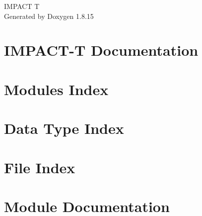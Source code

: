 \let\mypdfximage\pdfximage\def\pdfximage{\immediate\mypdfximage}\documentclass[twoside]{book}
\newcommand{\+}{\discretionary{\mbox{\scriptsize$\hookleftarrow$}}{}{}}
\newcommand{\clearemptydoublepage}{%
  \newpage{\pagestyle{empty}\cleardoublepage}%
}
\begin{document}
\hypersetup{pageanchor=false,
             bookmarksnumbered=true,
             pdfencoding=unicode
            }
\begin{titlepage}
\vspace*{7cm}
\begin{center}%
{\Large I\+M\+P\+A\+CT T }\\
\vspace*{1cm}
{\large Generated by Doxygen 1.8.15}\\
\end{center}
\end{titlepage}
\clearemptydoublepage
{}
\tableofcontents
\clearemptydoublepage
{}
\hypersetup{pageanchor=true}

\chapter{I\+M\+P\+A\+C\+T-\/T Documentation}
\label{index}\hypertarget{index}{}
\chapter{Modules Index}

\chapter{Data Type Index}

\chapter{File Index}

\chapter{Module Documentation}




































\end{document}
